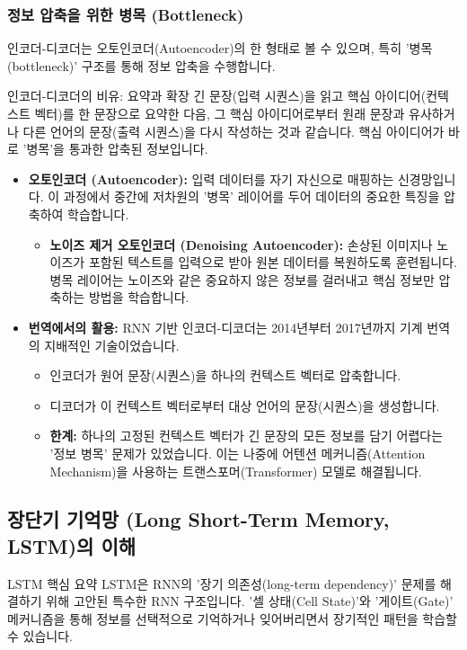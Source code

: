 \documentclass[11pt,a4paper]{article}
\begin{document}
\subsubsection{정보 압축을 위한 병목 (Bottleneck)}
인코더-디코더는 오토인코더(Autoencoder)의 한 형태로 볼 수 있으며, 특히 '병목(bottleneck)' 구조를 통해 정보 압축을 수행합니다.

\begin{examplebox}{인코더-디코더의 비유: 요약과 확장}
긴 문장(입력 시퀀스)을 읽고 핵심 아이디어(컨텍스트 벡터)를 한 문장으로 요약한 다음, 그 핵심 아이디어로부터 원래 문장과 유사하거나 다른 언어의 문장(출력 시퀀스)을 다시 작성하는 것과 같습니다. 핵심 아이디어가 바로 '병목'을 통과한 압축된 정보입니다.
\end{examplebox}

\begin{itemize}
    \item \textbf{오토인코더 (Autoencoder):} 입력 데이터를 자기 자신으로 매핑하는 신경망입니다. 이 과정에서 중간에 저차원의 '병목' 레이어를 두어 데이터의 중요한 특징을 압축하여 학습합니다.
        \begin{itemize}
            \item \textbf{노이즈 제거 오토인코더 (Denoising Autoencoder):} 손상된 이미지나 노이즈가 포함된 텍스트를 입력으로 받아 원본 데이터를 복원하도록 훈련됩니다. 병목 레이어는 노이즈와 같은 중요하지 않은 정보를 걸러내고 핵심 정보만 압축하는 방법을 학습합니다.
        \end{itemize}
    \item \textbf{번역에서의 활용:} RNN 기반 인코더-디코더는 2014년부터 2017년까지 기계 번역의 지배적인 기술이었습니다.
        \begin{itemize}
            \item 인코더가 원어 문장(시퀀스)을 하나의 컨텍스트 벡터로 압축합니다.
            \item 디코더가 이 컨텍스트 벡터로부터 대상 언어의 문장(시퀀스)을 생성합니다.
            \item \textbf{한계:} 하나의 고정된 컨텍스트 벡터가 긴 문장의 모든 정보를 담기 어렵다는 '정보 병목' 문제가 있었습니다. 이는 나중에 어텐션 메커니즘(Attention Mechanism)을 사용하는 트랜스포머(Transformer) 모델로 해결됩니다.
        \end{itemize}
\end{itemize}

\subsection{장단기 기억망 (Long Short-Term Memory, LSTM)의 이해}
\begin{summarybox}{LSTM 핵심 요약}
LSTM은 RNN의 '장기 의존성(long-term dependency)' 문제를 해결하기 위해 고안된 특수한 RNN 구조입니다. '셀 상태(Cell State)'와 '게이트(Gate)' 메커니즘을 통해 정보를 선택적으로 기억하거나 잊어버리면서 장기적인 패턴을 학습할 수 있습니다.
\end{summarybox}
\end{document}
